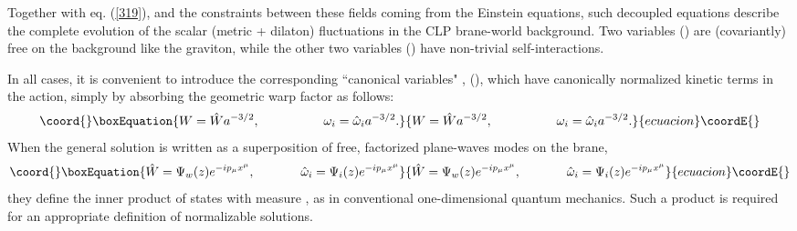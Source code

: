 \documentclass[a4paper,12pt]{article}
\begin{document}
Together with eq. (\ref{319}), and the constraints between these
fields coming from the Einstein equations, such decoupled
equations describe the complete evolution of the scalar (metric +
dilaton) fluctuations in the CLP brane-world background. Two
variables (\coordHE{}) are (covariantly) free on the
background like the graviton, while the other two variables
(\coordHE{}) have non-trivial self-interactions.

In all cases, it is convenient to introduce the corresponding ``canonical
variables" \coordHE{}, \coordHE{} (\coordHE{}), which have
canonically normalized   kinetic terms \cite{MBF} in the action,
simply by absorbing the geometric warp factor as follows:
\begin{equation}\coord{}\boxEquation{
W= \hat W a^{-3/2}, ~~~~~~~~~~~~~~~ \omega_i= \hat \omega_i
a^{-3/2}. \label{328}
}{
W= \hat W a^{-3/2}, ~~~~~~~~~~~~~~~ \omega_i= \hat \omega_i
a^{-3/2}. }{ecuacion}\coordE{}\end{equation}
When the general solution is written as a  superposition of free,
factorized plane-waves modes on the brane,
\begin{equation}\coord{}\boxEquation{
\hat W= \Psi_w(z)  e^{-ip_\mu x^\mu}, ~~~~~~~~~~~ \hat \omega_i=
\Psi_i(z) e^{-ip_\mu x^\mu}
\label{329}
}{
\hat W= \Psi_w(z)  e^{-ip_\mu x^\mu}, ~~~~~~~~~~~ \hat \omega_i=
\Psi_i(z) e^{-ip_\mu x^\mu}
}{ecuacion}\coordE{}\end{equation}
they define the inner product of states with measure \coordHE{}, as in
conventional one-dimensional quantum mechanics. Such a product is
required for an appropriate definition of normalizable solutions.
\end{document}
